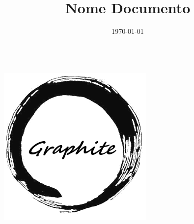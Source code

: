 \documentclass[openany,12pt,a4paper]{report}
\title{Nome Documento}
\author{}
\date{\today}
\begin{document}
	\makeatletter
	\begin{titlepage}
		\begin{center}
			{\huge \bfseries  \@title }\\[15ex] 
			\includegraphics[width=0.5\linewidth]{./img/logo.png}\\
			[40ex] 
			{\large \@date}
		\end{center}
	\end{titlepage}
	\makeatother
	\thispagestyle{empty}
	\newpage
	\tableofcontents
	
	
	

	
\end{document}
